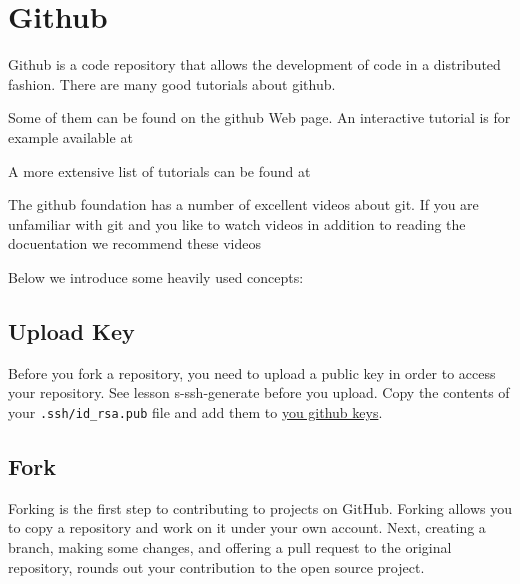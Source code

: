 \section{Github}\label{github}

Github is a code repository that allows the development of code in a
distributed fashion. There are many good tutorials about github.

Some of them can be found on the github Web page. An interactive
tutorial is for example available at


A more extensive list of tutorials can be found at


The github foundation has a number of excellent videos about git. If you
are unfamiliar with git and you like to watch videos in addition to
reading the docuentation we recommend these videos


Below we introduce some heavily used concepts:

\subsection{Upload Key}\label{upload-key}

Before you fork a repository, you need to upload a public key in order
to access your repository. See lesson s-ssh-generate before you upload.
Copy the contents of your \texttt{.ssh/id\_rsa.pub} file and add them to
\href{https://github.com/settings/keys}{you github keys}.


\subsection{Fork}\label{fork}

Forking is the first step to contributing to projects on GitHub. Forking
allows you to copy a repository and work on it under your own account.
Next, creating a branch, making some changes, and offering a pull
request to the original repository, rounds out your contribution to the
open source project.


